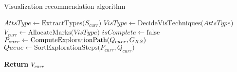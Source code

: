 


%        
%  
%
%        




  \begin{algorithm}[t]
   \caption{Visualization recommendation algorithm}
    \label{fig:algVisRec}
 $AttsType \leftarrow \text{ExtractTypes(} S_{curr} \text{)}$\;  \label{lst:line:chartT}
  $VisType  \leftarrow \text{DecideVisTechniques(} AttsType \text{)}$\;   \label{lst:line:visT}
    $V_{curr}  \leftarrow \text{AllocateMarks(} VisType \text{)}$\; \label{lst:line:4}
   $isComplete  \leftarrow \text{false}$  \;
     $P_{curr}  \leftarrow \text{ComputeExplorationPath(} Q_{curr},G_{XS} \text{)}$\;  \label{lst:line:Qpath}
    $Queue  \leftarrow \text{SortExplorationSteps(} P_{curr}, Q_{curr} \text{)}$ \;  \label{lst:line:QpathSort}
    {}
    
            

 
 \textbf{Return} $V_{curr}$\;
    \end{algorithm}
